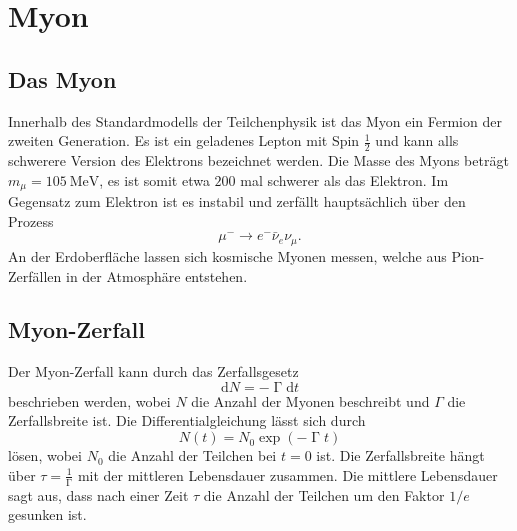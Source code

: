 \section{Myon}
\subsection{Das Myon}
Innerhalb des Standardmodells der Teilchenphysik ist das Myon ein Fermion der zweiten Generation. Es ist ein geladenes Lepton mit Spin $\frac{1}{2}$  und kann alls schwerere Version des Elektrons bezeichnet werden.
Die Masse des Myons beträgt $m_{\mu} = \SI{105}{\MeV}$, es ist somit etwa $200$ mal schwerer als das Elektron.
Im Gegensatz zum Elektron ist es instabil und zerfällt hauptsächlich über den Prozess
\begin{equation*}
    \mu^- \rightarrow e^- \bar \nu_e \nu_{\mu}.
\end{equation*}
An der Erdoberfläche lassen sich kosmische Myonen messen, welche aus Pion-Zerfällen in der Atmosphäre entstehen.
\subsection{Myon-Zerfall}
Der Myon-Zerfall kann durch das Zerfallsgesetz 
\begin{equation*}
    \mathrm{d} N = -\upGamma \mathrm{d}t
\end{equation*}
beschrieben werden, wobei $N $ die Anzahl der Myonen beschreibt und $\Gamma $ die Zerfallsbreite ist.
Die Differentialgleichung lässt sich durch 
\begin{equation}
    \label{eqn:Zerfall}
    N(t) = N_0 \exp \left(-\upGamma t \right)
\end{equation}
lösen, wobei $N_0$ die Anzahl der Teilchen bei $t = 0$ ist. Die Zerfallsbreite hängt über  $ \tau = \frac{1}{\upGamma}$ mit der mittleren Lebensdauer zusammen. 
Die mittlere Lebensdauer sagt aus, dass nach einer Zeit $\tau$ die Anzahl der Teilchen um den Faktor $1/e$ gesunken ist.